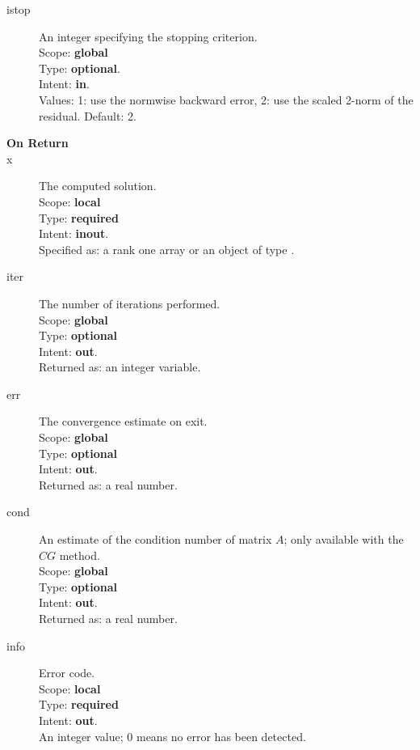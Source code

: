 \begin{description}
\item[istop]  An integer specifying the stopping criterion.\\
Scope: {\bf global} \\
Type: {\bf optional}.\\
Intent: {\bf in}.\\
Values: 1: use the normwise backward error, 2: use the scaled 2-norm
of the residual. Default: 2. 
\item[\bf On Return] 
\item[x] The computed solution. \\
Scope: {\bf local} \\
Type: {\bf required}\\
Intent: {\bf inout}.\\
Specified as:  a rank one array or an object of type \vdata.
\item[iter]  The number of iterations performed.\\
Scope: {\bf global} \\
Type: {\bf optional}\\
Intent: {\bf out}.\\
Returned  as: an integer variable.
\item[err]  The convergence estimate on exit.\\
Scope: {\bf global} \\
Type: {\bf optional}\\
Intent: {\bf out}.\\
Returned  as: a real number.
\item[cond]  An estimate of the condition number of matrix $A$; only
  available with the $CG$ method.\\
Scope: {\bf global} \\
Type: {\bf optional}\\
Intent: {\bf out}.\\
Returned  as: a real number.
\item[info] Error code.\\
Scope: {\bf local} \\
Type: {\bf required} \\
Intent: {\bf out}.\\
An integer value; 0 means no error has been detected. 
\end{description}


